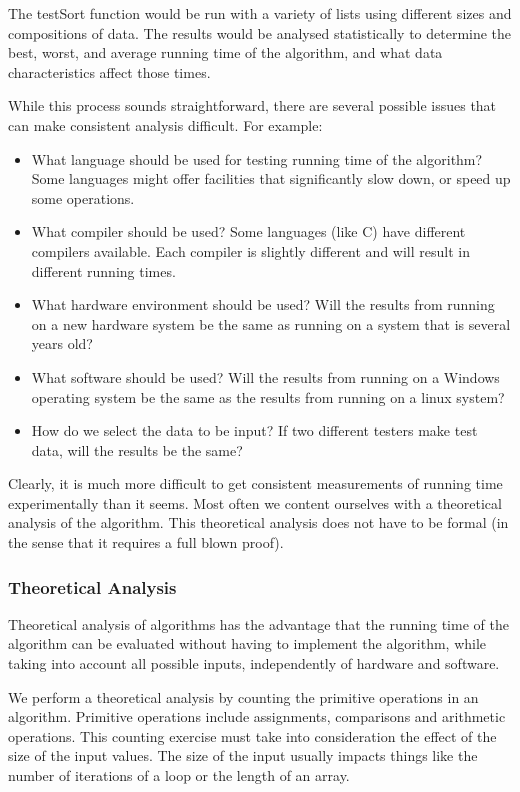 The testSort function would be run with a variety of lists using different sizes and compositions of data.   The results would be analysed statistically to determine  the best, worst, and average running time of the algorithm, and what data characteristics affect those times.

While this process sounds straightforward,  there are several  possible issues that can make consistent analysis difficult.  For example:

\begin{itemize}
\item What language should be used for testing running time of the algorithm?   Some languages might offer facilities that significantly slow down, or speed up some operations.
\item What compiler should be used?  Some languages (like C) have different compilers available.   Each compiler is slightly different and will result in different running times.
\item What hardware environment should be used?  Will the results from running on a new  hardware system be the same as running on a system that is several years old?
\item What software should be used?  Will the results from running on a Windows operating system be the same as the results from running on a linux system?   
\item How do we select the data to be input?   If two different testers make test data, will the results be the same?

\end{itemize}

Clearly, it is much more difficult to get consistent measurements of running time experimentally than it seems.    Most often we content ourselves with a theoretical analysis of the algorithm.  This theoretical analysis does not have to be formal (in the sense that it requires a full blown proof).  


\subsubsection{Theoretical Analysis}
Theoretical analysis of algorithms has the advantage that the running time of the algorithm can be evaluated without having to implement the algorithm,  while taking into account all possible inputs, independently of hardware and software.

We perform a theoretical analysis by counting the primitive operations in an algorithm.  Primitive operations include assignments, comparisons and arithmetic operations.     This counting exercise must take into consideration the effect of the size of the input values.  The size of the input usually  impacts things like the number of iterations of a loop or the length of an array.

